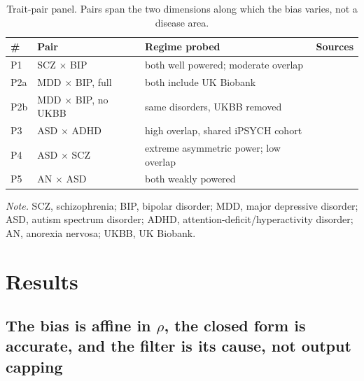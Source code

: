 \documentclass[12pt,a4paper]{article}
\begin{document}
\begin{table}[htbp]
\caption{Trait-pair panel. Pairs span the two dimensions along which the bias
varies, not a disease area.}\label{tab:panel}
\small
\begin{center}
\begin{tabular}{@{}ll>{\raggedright\arraybackslash}p{5.4cm}>{\raggedright\arraybackslash}p{4.6cm}@{}}
\toprule
\# & Pair & Regime probed & Sources \\
\midrule
P1  & SCZ $\times$ BIP & both well powered; moderate overlap & \citep{ref9,ref10} \\
P2a & MDD $\times$ BIP, full & both include UK Biobank & \citep{ref11,ref10} \\
P2b & MDD $\times$ BIP, no UKBB & same disorders, UKBB removed & \citep{ref11,ref10} \\
P3  & ASD $\times$ ADHD & high overlap, shared iPSYCH cohort & \citep{ref8,ref12} \\
P4  & ASD $\times$ SCZ & extreme asymmetric power; low overlap & \citep{ref8,ref9} \\
P5  & AN $\times$ ASD & both weakly powered & \citep{ref13,ref8} \\
\bottomrule
\end{tabular}
\par\smallskip\footnotesize\noindent \textit{Note.} SCZ, schizophrenia; BIP, bipolar disorder; MDD, major depressive disorder; ASD, autism spectrum disorder; ADHD, attention-deficit/hyperactivity disorder; AN, anorexia nervosa; UKBB, UK Biobank.
\end{center}
\end{table}

\section{Results}\label{sec:results}

\subsection{The bias is affine in $\rho$, the closed form is accurate, and the filter is its
cause, not output capping}\label{sec:attrib}
\end{document}
